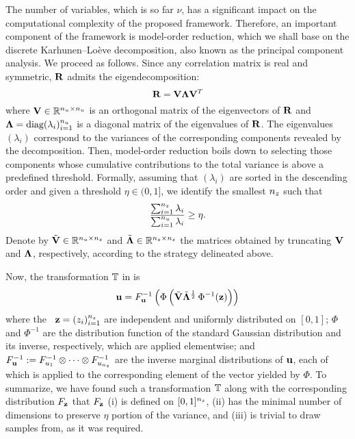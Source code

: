 The number of variables, which is so far $\nu$, has a significant impact on the
computational complexity of the proposed framework. Therefore, an important
component of the framework is model-order reduction, which we shall base on the
discrete Karhunen--Lo\`{e}ve decomposition, also known as the principal
component analysis. We proceed as follows. Since any correlation matrix is real
and symmetric, $\mathbf{R}$ admits the eigendecomposition:
\[
  \mathbf{R} = \mathbf{V} \mathbf{\Lambda} \mathbf{V}^T
\]
where $\mathbf{V} \in \mathbb{R}^{{n_u} \times {n_u}}$ is an orthogonal matrix of the
eigenvectors of $\mathbf{R}$ and $\mathbf{\Lambda} = \text{diag}(\lambda_i)_{i = 1}^{n_u}$
is a diagonal matrix of the eigenvalues of $\mathbf{R}$. The eigenvalues
$(\lambda_i)$ correspond to the variances of the corresponding components
revealed by the decomposition. Then, model-order reduction boils down to
selecting those components whose cumulative contributions to the total variance
is above a predefined threshold. Formally, assuming that $(\lambda_i)$ are
sorted in the descending order and given a threshold $\eta \in (0, 1]$, we
identify the smallest ${n_z}$ such that
\[
  \frac{\sum_{i = 1}^{n_z} \lambda_i}{\sum_{i = 1}^{n_u} \lambda_i} \geq \eta.
\]
Denote by $\tilde{\mathbf{V}} \in \mathbb{R}^{{n_u} \times {n_z}}$ and $\tilde{\mathbf{\Lambda}}
\in\mathbb{R}^{{n_z} \times {n_z}}$ the matrices obtained by truncating $\mathbf{V}$ and
$\mathbf{\Lambda}$, respectively, according to the strategy delineated above.

Now, the transformation $\mathbb{T}$ in  is
\begin{equation} \elab{transformation}
  \vu = \distribution_\vu^{-1} \left( \Phi\left( \tilde{\m{V}} \tilde{\m{\Lambda}}^\frac{1}{2} \, \Phi^{-1}(\vz) \right) \right)
\end{equation}
where the \rvs\ $\mathbf{z} = (z_i)_{i = 1}^{n_z}$ are independent and uniformly
distributed on $[0, 1]$; $\Phi$ and $\Phi^{-1}$ are the distribution function of
the standard Gaussian distribution and its inverse, respectively, which are
applied elementwise; and $F_{\mathbf{u}}^{-1} := F_{u_1}^{-1}
\otimes \cdots \otimes F_{u_{n_z}}^{-1}$ are the inverse marginal
distributions of $\mathbf{u}$, each of which is applied to the corresponding element of
the vector yielded by $\Phi$. To summarize, we have found such a transformation
$\mathbb{T}$ along with the corresponding distribution $F_{\mathbf{z}}$
that $F_{\mathbf{z}}$ (i) is defined on $[0, 1]^{n_z}$, (ii) has the minimal
number of dimensions to preserve $\eta$ portion of the variance, and (iii) is
trivial to draw samples from, as it was required.
